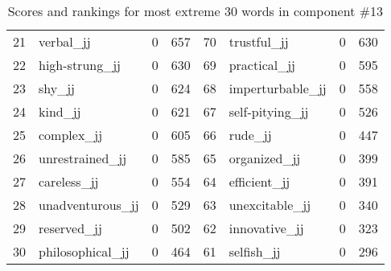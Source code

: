 \begin{table}[tbp]
\begin{tabular}{| rlr@{.}l | rlr@{.}l |}
    21 & verbal\_jj & 0 & 657    &    70 & trustful\_jj & 0 & 630 \\
    22 & high-strung\_jj & 0 & 630    &    69 & practical\_jj & 0 & 595 \\
    23 & shy\_jj & 0 & 624    &    68 & imperturbable\_jj & 0 & 558 \\
    24 & kind\_jj & 0 & 621    &    67 & self-pitying\_jj & 0 & 526 \\
    25 & complex\_jj & 0 & 605    &    66 & rude\_jj & 0 & 447 \\
    26 & unrestrained\_jj & 0 & 585    &    65 & organized\_jj & 0 & 399 \\
    27 & careless\_jj & 0 & 554    &    64 & efficient\_jj & 0 & 391 \\
    28 & unadventurous\_jj & 0 & 529    &    63 & unexcitable\_jj & 0 & 340 \\
    29 & reserved\_jj & 0 & 502    &    62 & innovative\_jj & 0 & 323 \\
    30 & philosophical\_jj & 0 & 464    &    61 & selfish\_jj & 0 & 296 \\
    \hline
    \end{tabular}
    \caption{Scores and rankings for most extreme 30 words in component \#13} 
\end{table}
\clearpage
